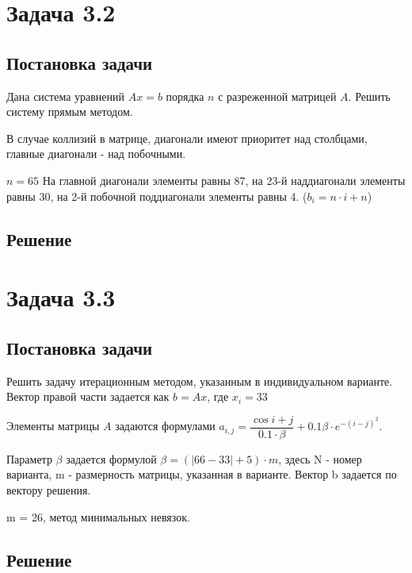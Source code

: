 \documentclass[a4paper,12pt]{report} %
\begin{document}
\section*{Задача 3.2}
\subsection*{Постановка задачи}

Дана система уравнений $Ax = b$ порядка $n$ с разреженной матрицей $A$. Решить систему прямым методом.

В случае коллизий в матрице, диагонали имеют приоритет над столбцами, главные диагонали - над побочными.

$n = 65$ На главной диагонали элементы равны 87, на 23-й наддиагонали элементы равны 30, на 2-й побочной поддиагонали элементы равны 4. ($b_i = n \cdot i + n$) 
\subsection*{Решение}

\section*{Задача 3.3}
\subsection*{Постановка задачи}

Решить задачу итерационным методом, указанным в индивидуальном варианте. Вектор правой части задается как $b = Ax$, где $x_i = 33$

Элементы матрицы $A$ задаются формулами \newline $a_{i, j} = \dfrac{\cos{i + j}}{0.1 \cdot \beta} + 0.1\beta \cdot e^{-(i - j)^2}$.

Параметр $\beta$ задается формулой $\beta = (|66 - 33| + 5) \cdot m$, здесь N - номер варианта, m - размерность матрицы, указанная в варианте. Вектор b задается по вектору решения.

m = 26, метод минимальных невязок.


\subsection*{Решение}
\end{document}
